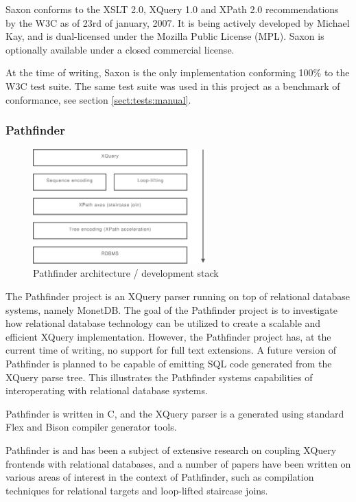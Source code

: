 Saxon conforms to the XSLT 2.0, XQuery 1.0 and XPath 2.0 recommendations
by the W3C as of 23rd of january, 2007. It is being actively
developed by Michael Kay, and is dual-licensed under the Mozilla Public License
(MPL). Saxon is optionally available under a closed commercial license.

At the time of writing, Saxon is the only implementation conforming 100\% to
the W3C test suite\cite{w3ctestresults}. The same test suite was used in this
project as a benchmark of conformance, see section \ref{sect:tests:manual}.

\subsubsection{Pathfinder}
\label{sect:soa:pathfinder}
\begin{figure}[!h]
  \centering
    \includegraphics[width=0.6\textwidth]{diagrams/pathfinder_arch}
  \caption{Pathfinder architecture / development stack}
\end{figure}

The Pathfinder project is an XQuery parser running on top of relational
database systems, namely MonetDB. The goal of the Pathfinder project is to
investigate how relational database technology can be utilized to create a
scalable and efficient XQuery implementation. However, the Pathfinder project
has, at the current time of writing, no support for full text extensions. A
future version of Pathfinder is planned to be capable of emitting SQL code
generated from the XQuery parse tree. This illustrates the Pathfinder systems
capabilities of interoperating with relational database systems.

Pathfinder is written in C, and the XQuery parser is a generated using standard
Flex and Bison compiler generator tools.

Pathfinder is and has been a subject of extensive research on coupling XQuery
frontends with relational databases, and a number of papers have been written 
on various areas of interest in the context of Pathfinder, such as compilation
techniques for relational targets\cite{pathfinder_comptech} and loop-lifted
staircase joins\cite{pathfinder_staircase}.
